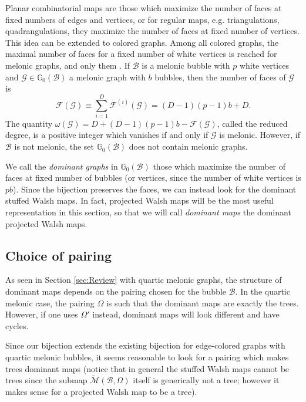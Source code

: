 \documentclass[aps,prd,10pt,notitlepage,nofootinbib,superscriptaddress,showkeys,showpacs]{revtex4-1}
\begin{document}
Planar combinatorial maps are those which maximize the number of faces at fixed numbers of edges and vertices, or for regular maps, e.g. triangulations, quadrangulations, they maximize the number of faces at fixed number of vertices. This idea can be extended to colored graphs. Among all colored graphs, the maximal number of faces for a fixed number of white vertices is reached for melonic graphs, and only them \cite{Melons}. If ${\mathcal{B}}$ is a melonic bubble with $p$ white vertices and ${\mathcal{G}}\in{\mathbb{G}}_0({\mathcal{B}})$ a melonic graph with $b$ bubbles, then the number of faces of ${\mathcal{G}}$ is
\begin{equation} \label{Faces}
{\mathcal{F}}({\mathcal{G}}) \equiv \sum_{i=1}^D {\mathcal{F}}^{(i)}({\mathcal{G}}) = (D-1)(p-1)b + D.
\end{equation}
The quantity $\omega({\mathcal{G}}) = D + (D-1)(p-1)b - {\mathcal{F}}({\mathcal{G}})$, called the reduced degree, is a positive integer which vanishes if and only if ${\mathcal{G}}$ is melonic. However, if ${\mathcal{B}}$ is not melonic, the set ${\mathbb{G}}_0({\mathcal{B}})$ does not contain melonic graphs.

We call the \emph{dominant graphs} in ${\mathbb{G}}_0({\mathcal{B}})$ those which maximize the number of faces at fixed number of bubbles (or vertices, since the number of white vertices is $pb$). Since the bijection preserves the faces, we can instead look for the dominant stuffed Walsh maps. In fact, projected Walsh maps will be the most useful representation in this section, so that we will call \emph{dominant maps} the dominant projected Walsh maps.

\subsection{Choice of pairing}

As seen in Section \ref{sec:Review} with quartic melonic graphs, the structure of dominant maps depends on the pairing chosen for the bubble ${\mathcal{B}}$. In the quartic melonic case, the pairing $\Omega$ is such that the dominant maps are exactly the trees. However, if one uses $\Omega'$ instead, dominant maps will look different and have cycles.

Since our bijection extends the existing bijection for edge-colored graphs with quartic melonic bubbles, it seems reasonable to look for a pairing which makes trees dominant maps (notice that in general the stuffed Walsh maps cannot be trees since the submap $\tilde{\mathcal{M}}({\mathcal{B}}, \Omega)$ itself is generically not a tree; however it makes sense for a projected Walsh map to be a tree).
\end{document}
